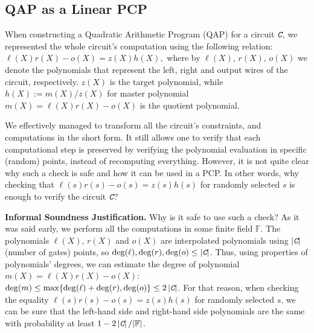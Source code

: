 \documentclass[../lecture-notes-148x210.tex]{subfiles}
\begin{document}
\subsection{QAP as a Linear PCP}

When constructing a Quadratic Arithmetic Program (QAP) for a circuit $\textit{\texttt{C}}$, we
represented the whole circuit's computation using the following relation:
$
    \ell(X)r(X) - o(X) = z(X)h(X),
$
where by $\ell(X)$, $r(X)$, $o(X)$ we denote the polynomials that represent the
left, right and output wires of the circuit, respectively. $z(X)$ is the target
polynomial, while $h(X) := m(X)\big/z(X)$ for master polynomial $m(X) =
\ell(X)r(X) - o(X)$ is the quotient polynomial.

We effectively managed to transform all the circuit's constraints, and
computations in the short form. It still allows one to verify that each
computational step is preserved by verifying the polynomial evaluation in
specific (random) points, instead of recomputing everything. However, it is not
quite clear why such a check is safe and how it can be used in a PCP. In other
words, why checking that $\ell(s)r(s)-o(s)=z(s)h(s)$ for randomly selected $s$
is enough to verify the circuit $\textit{\texttt{C}}$?

\textbf{Informal Soundness Justification.} Why is it safe to use such a check?
As it was said early, we perform all the computations in some finite field
$\mathbb{F}$. The polynomials $\ell(X)$, $r(X)$ and $o(X)$ are interpolated
polynomials using $\left| \textit{\texttt{C}} \right|$ (number of gates) points, so
$\deg(\ell), \deg(r), \deg(o) \leq \left|\textit{\texttt{C}}\right|$. Thus, using properties
of polynomials' degrees, we can estimate the degree of polynomial $m(X) =
\ell(X)r(X) - o(X)$: $\deg(m) \leq \max\{\deg(\ell) + \deg(r), \deg(o)\} \leq 2
\left| \textit{\texttt{C}} \right|$. For that reason, when checking the equality
$\ell(s)r(s)-o(s)=z(s)h(s)$ for randomly selected $s$, we can be sure that the
left-hand side and right-hand side polynomials are the same with probability at
least $1-2\left|\textit{\texttt{C}}\right|/|\mathbb{F}|$.
\end{document}
